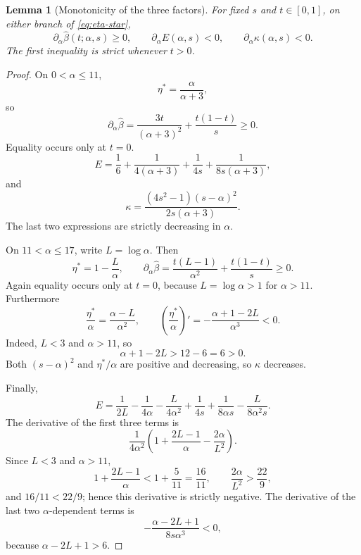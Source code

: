 \documentclass[10pt,a4paper]{amsart}
\newtheorem{lemma}{Lemma}
\newcommand{\betaHat}{\widehat\beta}
\newcommand{\etaStar}{\eta^{\ast}}
\begin{document}
\begin{lemma}[Monotonicity of the three factors]\label{lem:slab-monotone}
For fixed $s$ and $t\in[0,1]$, on either branch of \eqref{eq:eta-star},
\[
 \partial_\alpha\betaHat(t;\alpha,s)\ge0,
 \qquad
 \partial_\alpha E(\alpha,s)<0,
 \qquad
 \partial_\alpha\kappa(\alpha,s)<0.
\]
The first inequality is strict whenever $t>0$.
\end{lemma}

\begin{proof}
On $0<\alpha\le11$,
\[
 \etaStar=\frac{\alpha}{\alpha+3},
\]
so
\[
 \partial_\alpha\betaHat
 =\frac{3t}{(\alpha+3)^2}+\frac{t(1-t)}s\ge0.
\]
Equality occurs only at $t=0$.
\[
 E=\frac16+\frac1{4(\alpha+3)}
 +\frac1{4s}+\frac1{8s(\alpha+3)},
\]
and
\[
 \kappa
 =\frac{(4s^2-1)(s-\alpha)^2}{2s(\alpha+3)}.
\]
The last two expressions are strictly decreasing in $\alpha$.

On $11<\alpha\le17$, write $L=\log\alpha$.  Then
\[
 \etaStar=1-\frac L\alpha,
 \qquad
 \partial_\alpha\betaHat
 =\frac{t(L-1)}{\alpha^2}+\frac{t(1-t)}s\ge0.
\]
Again equality occurs only at $t=0$, because $L=\log\alpha>1$ for $\alpha>11$.
Furthermore
\[
 \frac{\etaStar}{\alpha}
 =\frac{\alpha-L}{\alpha^2},
 \qquad
 \left(\frac{\etaStar}{\alpha}\right)'
 =-\frac{\alpha+1-2L}{\alpha^3}<0.
\]
Indeed, $L<3$ and $\alpha>11$, so
\[
 \alpha+1-2L>12-6=6>0.
\]
Both $(s-\alpha)^2$ and $\etaStar/\alpha$ are positive and decreasing, so $\kappa$ decreases.

Finally,
\[
 E=
 \frac1{2L}-\frac1{4\alpha}-\frac{L}{4\alpha^2}
 +\frac1{4s}+\frac1{8\alpha s}-\frac{L}{8\alpha^2s}.
\]
The derivative of the first three terms is
\[
 \frac1{4\alpha^2}
 \left(1+\frac{2L-1}{\alpha}-\frac{2\alpha}{L^2}\right).
\]
Since $L<3$ and $\alpha>11$,
\[
 1+\frac{2L-1}{\alpha}
 <1+\frac5{11}=\frac{16}{11},
 \qquad
 \frac{2\alpha}{L^2}>\frac{22}{9},
\]
and $16/11<22/9$; hence this derivative is strictly negative.  The derivative of the last two $\alpha$-dependent terms is
\[
 -\frac{\alpha-2L+1}{8s\alpha^3}<0,
\]
because $\alpha-2L+1>6$.
\end{proof}
\end{document}
